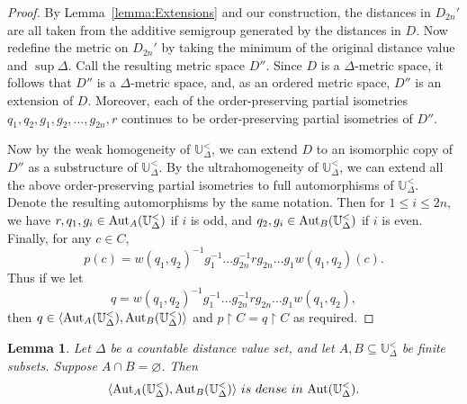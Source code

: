 \documentclass[10pt,a4paper]{amsart}
\newtheorem{lemma}[theorem]{Lemma}
\theoremstyle{definition}
\theoremstyle{remark}
\begin{document}
\begin{proof}
By Lemma~\ref{lemma:Extensions} and our construction, the distances in $D_{2n}'$ are all taken from the additive semigroup generated by the distances in $D$. Now redefine the metric on $D_{2n}'$ by taking the minimum of the original distance value and $\sup\Delta$. Call the resulting metric space $D''$. Since $D$ is a $\Delta$-metric space, it follows that $D''$ is a $\Delta$-metric space, and, as an ordered metric space, $D''$ is an extension of $D$. Moreover, each of the order-preserving partial isometries $q_1, q_2, g_1, g_2, \dots, g_{2n}, r$ continues to be order-preserving partial isometries of $D''$. 

Now by the weak homogeneity of $\mathbb{U}_{\Delta}^<$, we can extend $D$ to an isomorphic copy of $D''$ as a substructure of $\mathbb{U}_\Delta^<$. By the ultrahomogeneity of $\mathbb{U}_\Delta^<$, we can extend all the above order-preserving partial isometries to full automorphisms of $\mathbb{U}_{\Delta}^<$. Denote the resulting automorphisms by the same notation. Then for $1\leq i\leq 2n$, we have $r, q_1,g_i \in {\rm Aut}_A(\mathbb{U}_{\Delta}^<)$ if $i$ is odd, and $q_2,g_i \in {\rm Aut}_B(\mathbb{U}_{\Delta}^<)$ if $i$ is even. Finally, for any $c \in C$, \[p(c)=w(q_1,q_2)^{-1}g_1^{-1}\dots g_{2n}^{-1}rg_{2n}\dots g_1w(q_1,q_2)(c).\]
Thus if we let 
$$q=w(q_1,q_2)^{-1}g_1^{-1}\dots g_{2n}^{-1}rg_{2n}\dots g_1w(q_1,q_2), $$
then $q\in \langle {\rm Aut}_A(\mathbb{U}_\Delta^<), {\rm Aut}_B(\mathbb{U}_\Delta^<) \rangle$ and $p\upharpoonright C=q\upharpoonright C$ as required.
     \end{proof}

     \begin{lemma}\label{theorem:density}
        Let $\Delta$ be a countable distance value set, and let $A,B \subseteq \mathbb{U}_{\Delta}^<$ be finite subsets. Suppose $A \cap B = \varnothing$. Then \[\langle {\rm Aut}_A(\mathbb{U}_{\Delta}^<), {\rm Aut}_B(\mathbb{U}_{\Delta}^<) \rangle  \ is \ dense \ in \  {\rm Aut}(\mathbb{U}_{\Delta}^<).\]
\end{lemma}    
\end{document}
